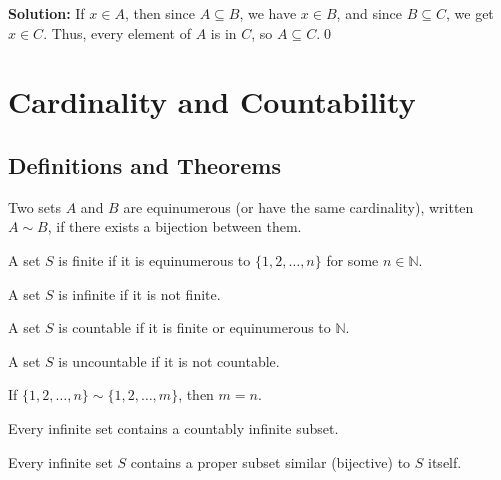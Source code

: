 \noindent\bigskip\noindent\textbf{Solution:}  
If \( x \in A \), then since \( A \subseteq B \), we have \( x \in B \), and since \( B \subseteq C \), we get \( x \in C \).  
Thus, every element of \( A \) is in \( C \), so \( A \subseteq C \).\qed

\section{Cardinality and Countability}

\subsection*{Definitions and Theorems}

\begin{definition}
Two sets $A$ and $B$ are equinumerous (or have the same cardinality), written $A \sim B$, if there exists a bijection between them.
\end{definition}

\begin{definition}
A set $S$ is finite if it is equinumerous to $\{1, 2, \ldots, n\}$ for some $n \in \mathbb{N}$.
\end{definition}

\begin{definition}
A set $S$ is infinite if it is not finite.
\end{definition}

\begin{definition}
A set $S$ is countable if it is finite or equinumerous to $\mathbb{N}$.
\end{definition}

\begin{definition}
A set $S$ is uncountable if it is not countable.
\end{definition}

\begin{theorem}
If $\{1, 2, \ldots, n\} \sim \{1, 2, \ldots, m\}$, then $m = n$.
\end{theorem}

\begin{theorem}
Every infinite set contains a countably infinite subset.
\end{theorem}

\begin{theorem}
Every infinite set $S$ contains a proper subset similar (bijective) to $S$ itself.
\end{theorem}


